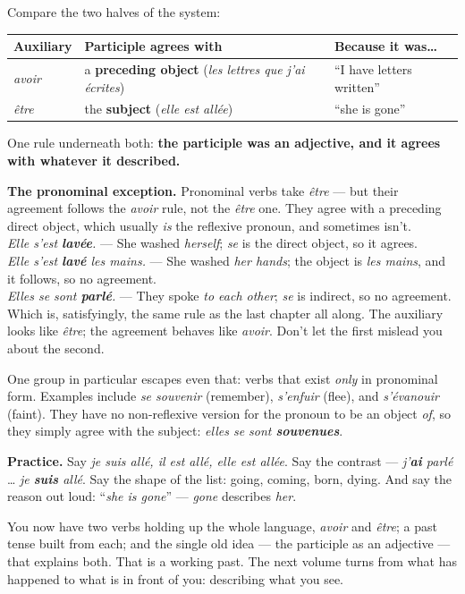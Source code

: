 Compare the two halves of the system:

\begin{center}
\begin{tabularx}{\linewidth}{@{}ll>{\raggedright\arraybackslash}X@{}}
\toprule
Auxiliary & Participle agrees with & Because it was\ldots \\
\midrule
\emph{avoir} & a \textbf{preceding object} (\emph{les lettres que j'ai \'{e}crites}) & ``I have letters written'' \\
\emph{\^{e}tre} & the \textbf{subject} (\emph{elle est all\'{e}e}) & ``she is gone'' \\
\bottomrule
\end{tabularx}
\end{center}

One rule underneath both: \textbf{the participle was an adjective, and it agrees
with whatever it described.}

\begin{grammarlens}
\textbf{The pronominal exception.} Pronominal verbs take \emph{\^{e}tre} --- but
their agreement follows the \emph{avoir} rule, not the \emph{\^{e}tre} one. They
agree with a preceding direct object, which usually \emph{is} the reflexive
pronoun, and sometimes isn't.\\[3pt]
\emph{Elle s'est \textbf{lav\'{e}e}.} --- She washed \emph{herself};
\emph{se} is the direct object, so it agrees.\\[3pt]
\emph{Elle s'est \textbf{lav\'{e}} les mains.} --- She washed \emph{her hands};
the object is \emph{les mains}, and it follows, so no agreement.\\[3pt]
\emph{Elles se sont \textbf{parl\'{e}}.} --- They spoke \emph{to each other};
\emph{se} is indirect, so no agreement.\\[3pt]
Which is, satisfyingly, the same rule as the last chapter all along. The
auxiliary looks like \emph{\^{e}tre}; the agreement behaves like \emph{avoir}.
Don't let the first mislead you about the second.
\end{grammarlens}

One group in particular escapes even that: verbs that exist \emph{only} in
pronominal form. Examples include \emph{se souvenir} (remember), \emph{s'enfuir}
(flee), and \emph{s'\'{e}vanouir} (faint). They have no non-reflexive version for
the pronoun to be an object \emph{of}, so they simply agree with the subject:
\emph{elles se sont \textbf{souvenues}}.

\begin{sounds}
\textbf{Practice.} Say \emph{je suis all\'{e}, il est all\'{e}, elle est
all\'{e}e}. Say the contrast --- \emph{j'\textbf{ai} parl\'{e}} \ldots{}
\emph{je \textbf{suis} all\'{e}}. Say the shape of the list: going, coming,
born, dying. And say the reason out loud: ``\emph{she is gone}'' ---
\emph{gone} describes \emph{her}.
\end{sounds}

You now have two verbs holding up the whole language, \emph{avoir} and
\emph{\^{e}tre}; a past tense built from each; and the single old idea --- the
participle as an adjective --- that explains both. That is a working past. The
next volume turns from what has happened to what is in front of you:
describing what you see.
